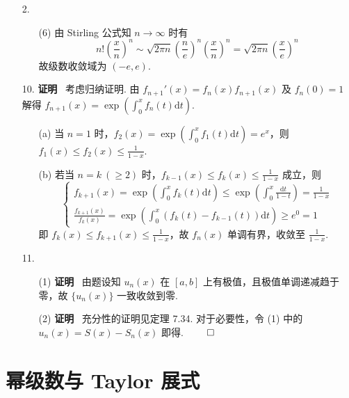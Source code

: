 \documentclass[11pt,oneside,fontset=fandol]{ctexbook} %
\begin{document}
\begin{enumerate}
    \item[2.]
    \begin{enumerate}
        \item[(6)]
        由 Stirling 公式知 $n \to \infty$ 时有
        \[
            n! \left( \frac x n \right)^n \sim \sqrt{2 \pi n} \left( \frac n e \right)^n \left( \frac x n \right)^n = \sqrt{2 \pi n} \left( \frac x e \right)^n
        \]
        故级数收敛域为 $(-e, e)$.
    \end{enumerate}
    \item[10.]
    \textbf{证明} \ 考虑归纳证明. 由 $f_{n+1}'(x) = f_n(x) f_{n+1}(x)$ 及 $f_n(0) = 1$ 解得 $f_{n+1}(x) = \exp\left( \int_0^x f_n(t) \mathrm dt \right)$.
    \begin{enumerate}
        \item[(a)]
        当 $n = 1$ 时，$f_2(x) = \exp\left( \int_0^x f_1(t) \mathrm dt \right) = e^x$，则 $f_1(x) \leqslant f_2(x) \leqslant \frac 1 {1 - x}$.
        \item[(b)]
        若当 $n = k \ (\geqslant 2)$ 时，$f_{k-1}(x) \leqslant f_k(x) \leqslant \frac 1 {1 - x}$ 成立，则
        \[
            \begin{cases}
                f_{k+1}(x) = \exp\left( \int_0^x f_k(t) \mathrm dt \right) \leqslant \exp\left( \int_0^x \frac{\mathrm dt}{1 - t} \right) = \frac 1 {1 - x} \\
                \frac{f_{k+1}(x)}{f_k(x)} = \exp\left( \int_0^x \left( f_k(t) - f_{k-1}(t) \right) \mathrm dt \right) \geqslant e^0 = 1
            \end{cases}
        \]
        即 $f_k(x) \leqslant f_{k+1}(x) \leqslant \frac 1 {1 - x}$，故 $f_n(x)$ 单调有界，收敛至 $\frac 1 {1-x}$.
    \end{enumerate}
    \item[11.]
    \begin{enumerate}
        \item[(1)]
        \textbf{证明} \ 由题设知 $u_n(x)$ 在 $[a, b]$ 上有极值，且极值单调递减趋于零，故 $\{ u_n(x) \}$ 一致收敛到零.
        \item[(2)]
        \textbf{证明} \ 充分性的证明见定理 7.34. 对于必要性，令 (1) 中的 $u_n(x) = S(x) - S_n(x)$ 即得.
        $\hfill\qed$
    \end{enumerate}
\end{enumerate}

\section{幂级数与 Taylor 展式}
\end{document}
